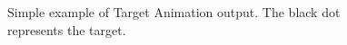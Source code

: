 \documentclass[a4paper,11pt]{article}
\begin{document}
\begin{figure}[ht]
\begin{minipage}{0.2\textwidth}
\end{minipage}
\begin{minipage}{0.2\textwidth}
\end{minipage}
\caption{Simple example of Target Animation output. The black dot represents the target.}
\label{target_animation_example}
\end{figure}
\end{document}
